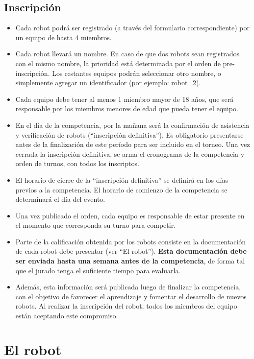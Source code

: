 \documentclass[a4paper,11pt]{article}
\begin{document}
\subsection*{Inscripción}
\begin{itemize}
  \item Cada robot podrá ser registrado (a través del formulario correspondiente) por un equipo de hasta 4 miembros.
  \item Cada robot llevará un nombre. En caso de que dos robots sean registrados con el mismo nombre, la prioridad está determinada por el orden de pre-inscripción. Los restantes equipos podrán seleccionar otro nombre, o simplemente agregar un identificador (por ejemplo: robot\_2).
  \item Cada equipo debe tener al menos 1 miembro mayor de 18 años, que será responsable por los miembros menores de edad que pueda tener el equipo.
  \item En el día de la competencia, por la mañana será la confirmación de asistencia y verificación de robots (``inscripción definitiva''). Es obligatorio presentarse antes de la finalización de este período para ser incluido en el torneo. Una vez cerrada la inscripción definitiva, se arma el cronograma de la competencia y orden de turnos, con todos los inscriptos.
  \item El horario de cierre de la ``inscripción definitiva'' se definirá en los días previos a la competencia. El horario de comienzo de la competencia se determinará el día del evento.
  \item Una vez publicado el orden, cada equipo es responsable de estar presente en el momento que corresponda su turno para competir.
  \item Parte de la calificación obtenida por los robots consiste en la documentación de cada robot debe presentar (ver ``El robot''). \textbf{Esta documentación debe ser enviada hasta una semana antes de la competencia}, de forma tal que el jurado tenga el suficiente tiempo para evaluarla.
  \item Además, esta información será publicada luego de finalizar la competencia, con el objetivo de favorecer el aprendizaje y fomentar el desarrollo de nuevos robots. Al realizar la inscripción del robot, todos los miembros del equipo están aceptando este compromiso.
\end{itemize}

\section*{El robot}
\end{document}
